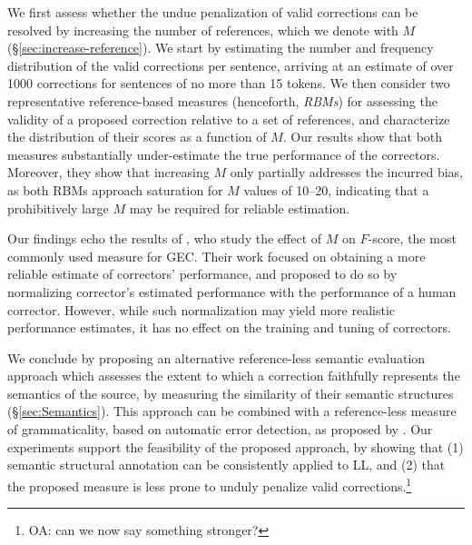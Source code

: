 \documentclass[letterpaper, 11pt]{article}
\newcommand{\oa}[1]{\footnote{\color{red}OA: #1}}
\begin{document}
We first assess whether the undue penalization of valid corrections can be resolved by increasing the number
of references, which we denote with $M$ (\S \ref{sec:increase-reference}).
We start by estimating the number and frequency distribution of the valid corrections per sentence,
arriving at an estimate of over 1000 corrections for sentences of no more than 15 tokens.
We then consider two representative reference-based measures (henceforth, {\it RBMs}) for
assessing the validity of a proposed correction relative to a set of references, 
and characterize the distribution of their scores as a function of $M$. 
Our results show that both measures substantially under-estimate the true performance of
the correctors. Moreover, they show that increasing $M$ only partially addresses
the incurred bias, as both RBMs approach saturation for $M$ values of 10--20,
indicating that a prohibitively large $M$ may be required for reliable estimation.

Our findings echo the results of , who study the effect of $M$
on $F$-score, the most commonly used measure for GEC. Their work focused on
obtaining a more reliable estimate of correctors' performance, and proposed to do so
by normalizing corrector's estimated performance with the performance of a human corrector. However, while such normalization may yield more realistic performance estimates,
it has no effect on the training and tuning of correctors. 

We conclude by proposing an alternative reference-less semantic evaluation approach which assesses the extent to which
a correction faithfully represents the semantics of the source, by measuring the similarity of their semantic structures (\S \ref{sec:Semantics}).
This approach can be combined with a reference-less measure of grammaticality, based on automatic error detection, as
proposed by .
Our experiments support the feasibility of the proposed approach,
by showing that (1) semantic structural annotation can be consistently applied to LL, and (2) that the proposed measure is less prone to unduly penalize valid corrections.\oa{can we now say something stronger?}

%
%
%
%
\end{document}
